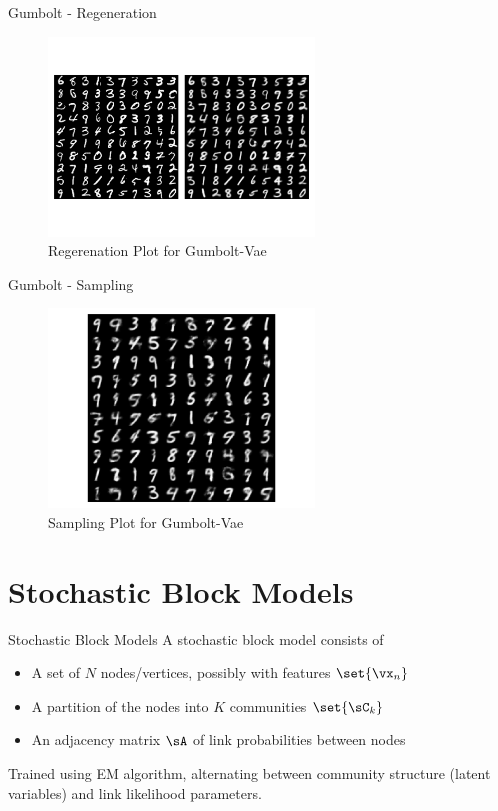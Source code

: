 \documentclass[9pt]{beamer}
\begin{document}
\begin{frame}{Gumbolt - Regeneration}
	\begin{figure}[htpb]
		\centering
		\includegraphics[height=200px]{includes/plots/gumbolt-vae/mnist/regenerated.png}
		\caption{Regerenation Plot for Gumbolt-Vae}
	\end{figure}
\end{frame}

\begin{frame}{Gumbolt - Sampling}
	\begin{figure}[htpb]
		\centering
		\includegraphics[height=200px]{includes/plots/gumbolt-vae/mnist/sampled.png}
		\caption{Sampling Plot for Gumbolt-Vae}
	\end{figure}
\end{frame}

\section{Stochastic Block Models}
\begin{frame}{Stochastic Block Models}
	A stochastic block model consists of
	\begin{itemize}
		\item A set of $N$ nodes/vertices, possibly with features $\set{\vx_{n}}$
		\item A partition of the nodes into $K$ communities $\set{\sC_k}$
		\item An adjacency matrix $\sA$ of link probabilities between nodes
	\end{itemize}

	Trained using EM algorithm, alternating between community structure (latent variables) and link likelihood parameters.
\end{frame}
\end{document}
